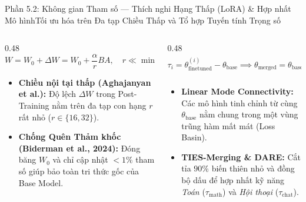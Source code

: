 \begin{frame}{Phần 5.2: Không gian Tham số --- Thích nghi Hạng Thấp (LoRA) \& Hợp nhất Mô hình}{Tối ưu hóa trên Đa tạp Chiều Thấp và Tổ hợp Tuyến tính Trọng số}
  \begin{columns}[T,onlytextwidth]
    \begin{column}{0.48\textwidth}
      \footnotesize
      \[
        W = W_0 + \Delta W = W_0 + \frac{\alpha}{r} B A, \quad r \ll \min(d, k)
      \]
      \begin{itemize}\setlength{\itemsep}{4pt}
        \item \textbf{Chiều nội tại thấp (Aghajanyan et al.):} Độ lệch $\Delta W$ trong Post-Training nằm trên đa tạp con hạng $r$ rất nhỏ ($r \in \{16, 32\}$).
        \item \textbf{Chống Quên Thảm khốc (Biderman et al., 2024):} Đóng băng $W_0$ và chỉ cập nhật $<1\%$ tham số giúp bảo toàn tri thức gốc của Base Model.
      \end{itemize}
    \end{column}
    \begin{column}{0.48\textwidth}
      \footnotesize
      \[
        \tau_i = \theta_{\text{finetuned}}^{(i)} - \theta_{\text{base}} \implies \theta_{\text{merged}} = \theta_{\text{base}} + \sum_{i=1}^{M} \lambda_i \tau_i
      \]
      \begin{itemize}\setlength{\itemsep}{4pt}
        \item \textbf{Linear Mode Connectivity:} Các mô hình tinh chỉnh từ cùng $\theta_{\text{base}}$ nằm chung trong một vùng trũng hàm mất mát (Loss Basin).
        \item \textbf{TIES-Merging \& DARE:} Cắt tỉa $90\%$ biến thiên nhỏ và đồng bộ dấu để hợp nhất kỹ năng \textit{Toán} ($\tau_{\text{math}}$) và \textit{Hội thoại} ($\tau_{\text{chat}}$).
      \end{itemize}
    \end{column}
  \end{columns}
\end{frame}

